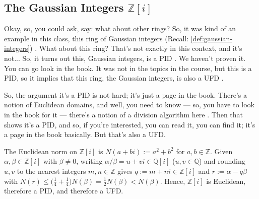 \subsection{The Gaussian Integers \texorpdfstring{$\mathbb{Z}[i]$}{Z[i]}}

\begin{speech}[00:02:16 - 00:03:11]
Okay, so, you could ask, say: what about other rings? So, it was kind of an example in this class, this ring of Gaussian integers (Recall: \cref{def:gaussian-integers}) . What about this ring? That's not exactly in this context, and it's not... So, it turns out this, Gaussian integers, is a PID . We haven't proven it. You can go look in the book. It was not in the topics in the course, but this is a PID, so it implies that this ring, the Gaussian integers, is also a UFD .

So, the argument it's a PID is not hard; it's just a page in the book. There's a notion of Euclidean domains, and well, you need to know --- so, you have to look in the book for it --- there's a notion of a division algorithm here . Then that shows it's a PID, and so, if you're interested, you can read it, you can find it; it's a page in the book basically. But that's also a UFD.
\end{speech}

\begin{content}
\end{content}

\begin{aiNote}
The Euclidean norm on $\mathbb{Z}[i]$ is $N(a + bi) := a^2 + b^2$ for $a, b \in \mathbb{Z}$. Given $\alpha, \beta \in \mathbb{Z}[i]$ with $\beta \neq 0$, writing $\alpha/\beta = u + vi \in \mathbb{Q}[i]$ ($u, v \in \mathbb{Q}$) and rounding $u, v$ to the nearest integers $m, n \in \mathbb{Z}$ gives $q := m + ni \in \mathbb{Z}[i]$ and $r := \alpha - q\beta$ with $N(r) \le \bigl(\frac{1}{4} + \frac{1}{4}\bigr) N(\beta) = \frac{1}{2} N(\beta) < N(\beta)$. Hence, $\mathbb{Z}[i]$ is Euclidean, therefore a PID, and therefore a UFD.
\end{aiNote}

